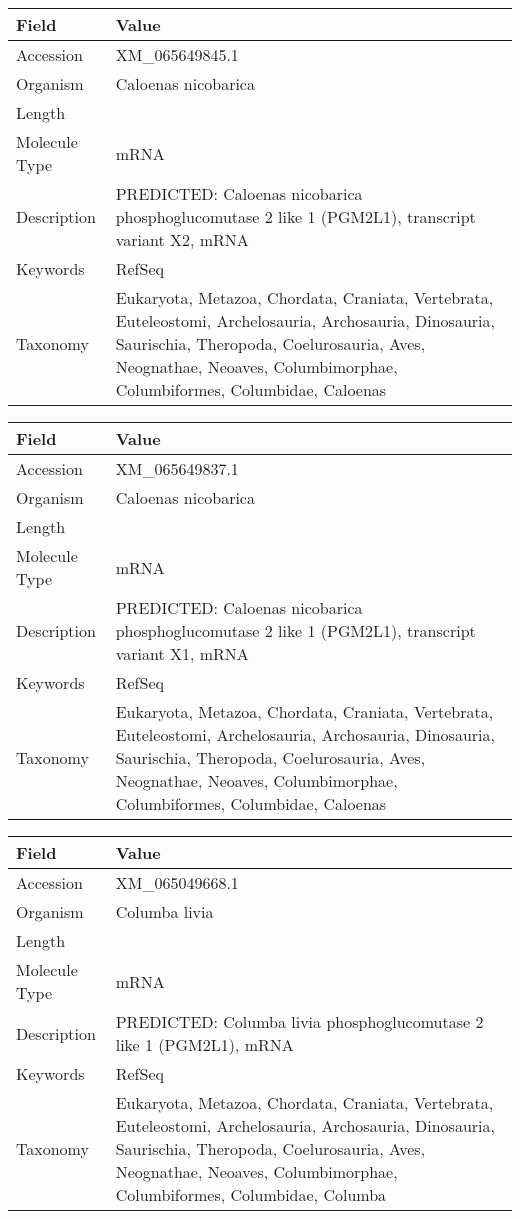 \documentclass[10pt]{article}
\begin{document}
\vspace{1em}
{\footnotesize
\begin{longtable}{>{\raggedright\arraybackslash}p{4.5cm} >{\raggedright\arraybackslash}p{11.5cm}}
\textbf{Field} & \textbf{Value} \\
\hline
Accession & XM\_065649845.1 \\
Organism & Caloenas nicobarica \\
Length & 5843 \\
Molecule Type & mRNA \\
Description & PREDICTED: Caloenas nicobarica phosphoglucomutase 2 like 1 (PGM2L1), transcript variant X2, mRNA \\
Keywords & RefSeq \\
Taxonomy & Eukaryota, Metazoa, Chordata, Craniata, Vertebrata, Euteleostomi, Archelosauria, Archosauria, Dinosauria, Saurischia, Theropoda, Coelurosauria, Aves, Neognathae, Neoaves, Columbimorphae, Columbiformes, Columbidae, Caloenas \\
\end{longtable}
}

\vspace{1em}
{\footnotesize
\begin{longtable}{>{\raggedright\arraybackslash}p{4.5cm} >{\raggedright\arraybackslash}p{11.5cm}}
\textbf{Field} & \textbf{Value} \\
\hline
Accession & XM\_065649837.1 \\
Organism & Caloenas nicobarica \\
Length & 5988 \\
Molecule Type & mRNA \\
Description & PREDICTED: Caloenas nicobarica phosphoglucomutase 2 like 1 (PGM2L1), transcript variant X1, mRNA \\
Keywords & RefSeq \\
Taxonomy & Eukaryota, Metazoa, Chordata, Craniata, Vertebrata, Euteleostomi, Archelosauria, Archosauria, Dinosauria, Saurischia, Theropoda, Coelurosauria, Aves, Neognathae, Neoaves, Columbimorphae, Columbiformes, Columbidae, Caloenas \\
\end{longtable}
}

\vspace{1em}
{\footnotesize
\begin{longtable}{>{\raggedright\arraybackslash}p{4.5cm} >{\raggedright\arraybackslash}p{11.5cm}}
\textbf{Field} & \textbf{Value} \\
\hline
Accession & XM\_065049668.1 \\
Organism & Columba livia \\
Length & 5769 \\
Molecule Type & mRNA \\
Description & PREDICTED: Columba livia phosphoglucomutase 2 like 1 (PGM2L1), mRNA \\
Keywords & RefSeq \\
Taxonomy & Eukaryota, Metazoa, Chordata, Craniata, Vertebrata, Euteleostomi, Archelosauria, Archosauria, Dinosauria, Saurischia, Theropoda, Coelurosauria, Aves, Neognathae, Neoaves, Columbimorphae, Columbiformes, Columbidae, Columba \\
\end{longtable}
}
\end{document}
